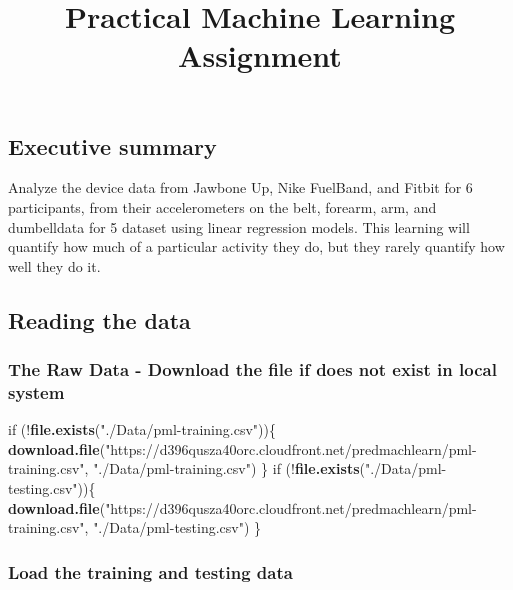 \documentclass[]{article}
\title{Practical Machine Learning Assignment}
\author{}
\date{}
\newenvironment{Shaded}{\begin{snugshade}}{\end{snugshade}}
\newcommand{\KeywordTok}[1]{\textcolor[rgb]{0.13,0.29,0.53}{\textbf{{#1}}}}
\newcommand{\StringTok}[1]{\textcolor[rgb]{0.31,0.60,0.02}{{#1}}}
\newcommand{\NormalTok}[1]{{#1}}
\begin{document}
\maketitle


\subsection{Executive summary}\label{executive-summary}

Analyze the device data from Jawbone Up, Nike FuelBand, and Fitbit for 6
participants, from their accelerometers on the belt, forearm, arm, and
dumbelldata for 5 dataset using linear regression models. This learning
will quantify how much of a particular activity they do, but they rarely
quantify how well they do it.

\subsection{Reading the data}\label{reading-the-data}

\subsubsection{The Raw Data - Download the file if does not exist in
local
system}\label{the-raw-data---download-the-file-if-does-not-exist-in-local-system}

\begin{Shaded}
\begin{Highlighting}[]
\NormalTok{if (!}\KeywordTok{file.exists}\NormalTok{(}\StringTok{"./Data/pml-training.csv"}\NormalTok{))\{}
  \KeywordTok{download.file}\NormalTok{(}\StringTok{"https://d396qusza40orc.cloudfront.net/predmachlearn/pml-training.csv"}\NormalTok{,}
                \StringTok{"./Data/pml-training.csv"}\NormalTok{)}
\NormalTok{\}}
\NormalTok{if (!}\KeywordTok{file.exists}\NormalTok{(}\StringTok{"./Data/pml-testing.csv"}\NormalTok{))\{}
  \KeywordTok{download.file}\NormalTok{(}\StringTok{"https://d396qusza40orc.cloudfront.net/predmachlearn/pml-training.csv"}\NormalTok{,}
                \StringTok{"./Data/pml-testing.csv"}\NormalTok{)}
\NormalTok{\}}
\end{Highlighting}
\end{Shaded}

\subsubsection{Load the training and testing
data}\label{load-the-training-and-testing-data}
\end{document}
